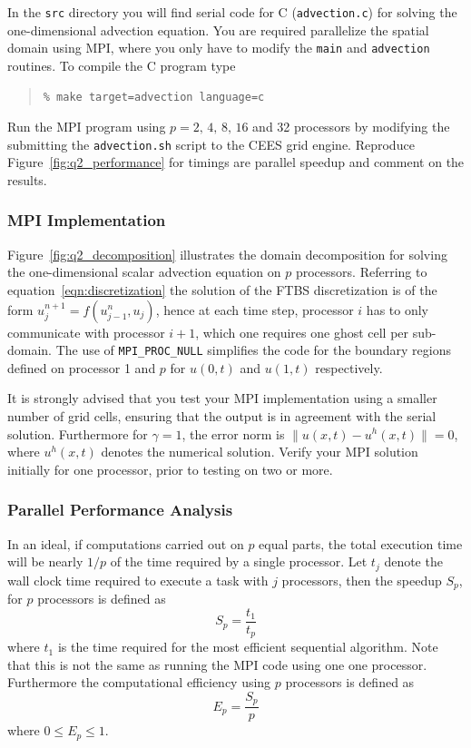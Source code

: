 In the \texttt{src} directory you will find serial code for C (\texttt{advection.c}) for solving the one-dimensional advection equation. You are required parallelize the spatial domain using MPI, where you only have to modify the \texttt{main} and \texttt{advection} routines. To compile the C program type
\begin{quote}
\begin{verbatim}
% make target=advection language=c 
\end{verbatim}
\end{quote}
Run the MPI program using $p = 2,\,4,\,8,\,16$ and 32 processors by modifying the submitting the \texttt{advection.sh} script to the CEES grid engine. Reproduce Figure~\ref{fig:q2_performance} for timings are parallel speedup and comment on the results.

\clearpage
\newpage
\subsubsection*{MPI Implementation}
Figure~\ref{fig:q2_decomposition} illustrates the domain decomposition for solving the one-dimensional scalar advection equation on $p$ processors. Referring to equation~\ref{eqn:discretization} the solution of the FTBS discretization is of the form $u^{n + 1}_j = f(u_{j - 1}^n, u_j)$, hence at each time step, processor $i$ has to only communicate with processor $i + 1$, which one requires one ghost cell per sub-domain. The use of \texttt{MPI\_PROC\_NULL} simplifies the code for the boundary regions defined on processor 1 and $p$ for $u(0, t)$ and $u(1, t)$ respectively.

It is strongly advised that you test your MPI implementation using a smaller number of grid cells, ensuring that the output is in agreement with the serial solution. Furthermore for $\gamma = 1$, the error norm is $\|u(x, t) - u^h(x, t)\| = 0$, where $u^h(x, t)$ denotes the numerical solution. Verify your MPI solution initially for one processor, prior to testing on two or more. 

\subsubsection*{Parallel Performance Analysis}
In an ideal, if computations carried out on $p$ equal parts, the total execution time will be nearly $1/p$ of the time required by a single processor. Let $t_j$ denote the wall clock time required to execute a task with $j$ processors, then the speedup $S_p$, for $p$ processors is defined as
\[
  S_p = \frac{t_1}{t_p}
\]
where $t_1$ is the time required for the most efficient sequential algorithm. Note that this is not the same as running the MPI code using one one processor. Furthermore the computational efficiency using $p$ processors is defined as 
\[
  E_p = \frac{S_p}{p}
\]
where $0 \le E_p \le 1$.

